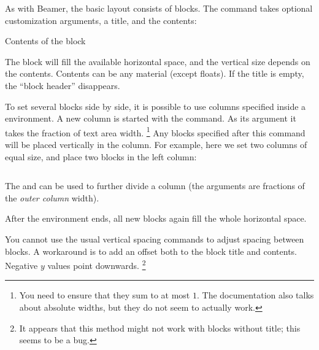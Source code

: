 As with Beamer, the basic layout consists of blocks.
The  command takes optional customization arguments,
a title, and the contents:
%
\begin{ExampleCode}
{
Contents of the block
}
\end{ExampleCode}
%
The block will fill the available horizontal space,
and the vertical size depends on the contents.
Contents can be any material (except floats).
If the title is empty, the ``block header'' disappears.

To set several blocks side by side, it is possible to use columns
specified inside a  environment.
A new column is started with the  command.
As its argument it takes the fraction of text area width.%
\footnote{You need to ensure that they sum to at most $1$.
The documentation also talks about absolute widths, but they do not seem to actually work.}
Any blocks specified after this command will be placed vertically in the column.
For example, here we set two columns of equal size,
and place two blocks in the left column:
%
\begin{ExampleCode}
\begin{columns}



\end{columns}
\end{ExampleCode}

The  and 
can be used to further divide a column
(the arguments are fractions of the \emph{outer column} width).

After the  environment ends,
all new blocks again fill the whole horizontal space.

You cannot use the usual vertical spacing commands to adjust spacing between blocks.
A workaround is to add an offset both to the block title and contents.
Negative $y$ values point downwards.%
\footnote{It appears that this method might not work with blocks without title;
this seems to be a bug.}
%
\begin{ExampleCode}
\end{ExampleCode}

